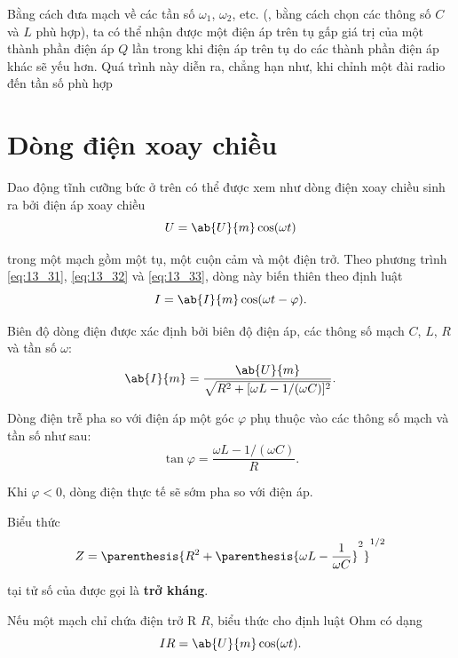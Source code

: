 \noindent
Bằng cách đưa mạch về các tần số $\omega_1$, $\omega_2$, etc. (\ie, bằng cách chọn các thông số $C$ và $L$ phù hợp), ta có thể nhận được một điện áp trên tụ gấp giá trị của một thành phần điện áp $Q$ lần trong khi điện áp trên tụ do các thành phần điện áp khác sẽ yếu hơn.
Quá trình này diễn ra, chẳng hạn như, khi chỉnh một đài radio đến tần số phù hợp

\section{Dòng điện xoay chiều}\label{sec:13_5}

Dao động tĩnh cưỡng bức ở trên có thể được xem như dòng điện xoay chiều sinh ra bởi điện áp xoay chiều
\vspace{-12pt}
\begin{equation}\label{eq:13_45}
    U = \ab{U}{m} \cos(\omega t)
\end{equation}

\noindent
trong một mạch gồm một tụ, một cuộn cảm và một điện trở.
Theo phương trình \eqref{eq:13_31}, \eqref{eq:13_32} và \eqref{eq:13_33}, dòng này biến thiên theo định luật
\begin{equation}\label{eq:13_46}
    I = \ab{I}{m} \cos(\omega t - \varphi).
\end{equation}

\noindent
Biên độ dòng điện được xác định bởi biên độ điện áp, các thông số mạch $C$, $L$, $R$ và tần số $\omega$:
\begin{equation}\label{eq:13_47}
    \ab{I}{m} = \frac{\ab{U}{m}}{\sqrt{R^2+[\omega L - 1/(\omega C)]^2}}.
\end{equation}

\noindent
Dòng điện trễ pha so với điện áp một góc $\varphi$ phụ thuộc vào các thông số mạch và tần số như sau:
\begin{equation}\label{eq:13_48}
    \tan\varphi = \frac{\omega L - 1/(\omega C)}{R}.
\end{equation}

\noindent
Khi $\varphi<0$, dòng điện thực tế sẽ sớm pha so với điện áp.

Biểu thức
\begin{equation}\label{eq:13_49}
    Z = \parenthesis{R^2 + \parenthesis{\omega L - \frac{1}{\omega C}}^2}^{1/2}
\end{equation}

\noindent
tại tử số của  được gọi là \textbf{trở kháng}.

Nếu một mạch chỉ chứa điện trở R $R$, biểu thức cho định luật Ohm có dạng
\begin{equation*}
    IR = \ab{U}{m} \cos(\omega t).
\end{equation*}

